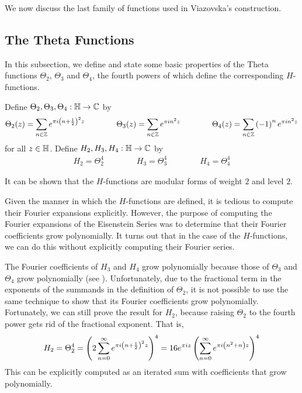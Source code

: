 We now discuss the last family of functions used in Viazovska's construction.

\subsection{The Theta Functions}
\label{Ch2:Subsec:ThetaFunctions}

In this subsection, we define and state some basic properties of the Theta functions $\Theta_2$, $\Theta_3$ and $\Theta_4$, the fourth powers of which define the corresponding $H$-functions.

\begin{boxdefinition}\label{Ch2:Def:Theta_H}
    Define $\Theta_2, \Theta_3, \Theta_4 : \mathbb{H} \to \mathbb{C}$ by
    \begin{align*}
        \Theta_2(z) = \sum_{n \in \mathbb{Z}} e^{\pi i \left( n + \frac{1}{2} \right)^2 z}
        \qquad\qquad
        \Theta_3(z) = \sum_{n \in \mathbb{Z}} e^{\pi i n^2 z}
        \qquad\qquad
        \Theta_4(z) = \sum_{n \in \mathbb{Z}} \left( -1 \right)^n e^{\pi i n^2 z}
    \end{align*}
    for all $z \in \mathbb{H}$. Define $H_2, H_3, H_4 : \mathbb{H} \to \mathbb{C}$ by
    \begin{align*}
        H_2 = \Theta_2^4 \qquad\qquad
        H_3 = \Theta_3^4 \qquad\qquad
        H_4 = \Theta_4^4
    \end{align*}
\end{boxdefinition}

It can be shown that the $H$-functions are modular forms of weight $2$ and level $2$.

Given the manner in which the $H$-functions are defined, it is tedious to compute their Fourier expansions explicitly. However, the purpose of computing the Fourier expansions of the Eisenstein Series was to determine that their Fourier coefficients grow polynomially. It turns out that in the case of the $H$-functions, we can do this without explicitly computing their Fourier series.

The Fourier coefficients of $H_3$ and $H_4$ grow polynomially because those of $\Theta_3$ and $\Theta_4$ grow polynomially (see ). Unfortunately, due to the fractional term in the exponents of the summands in the definition of $\Theta_2$, it is not possible to use the same technique to show that its Fourier coefficients grow polynomially. Fortunately, we can still prove the result for $H_2$, because raising $\Theta_2$ to the fourth power gets rid of the fractional exponent. That is,
\begin{align}
    H_2 = \Theta_2^4
    = \left( 2\sum_{n =0}^{\infty} e^{\pi i \left( n + \frac{1}{2} \right)^2 z} \right)^4
    = 16 e^{\pi i z} \left( \sum_{n =0}^{\infty} e^{\pi i \left( n^2 + n \right) z} \right)^4 \label{Ch2:Eq:H2_qexpansion_explicit}
\end{align}
This can be explicitly computed as an iterated sum with coefficients that grow polynomially.


